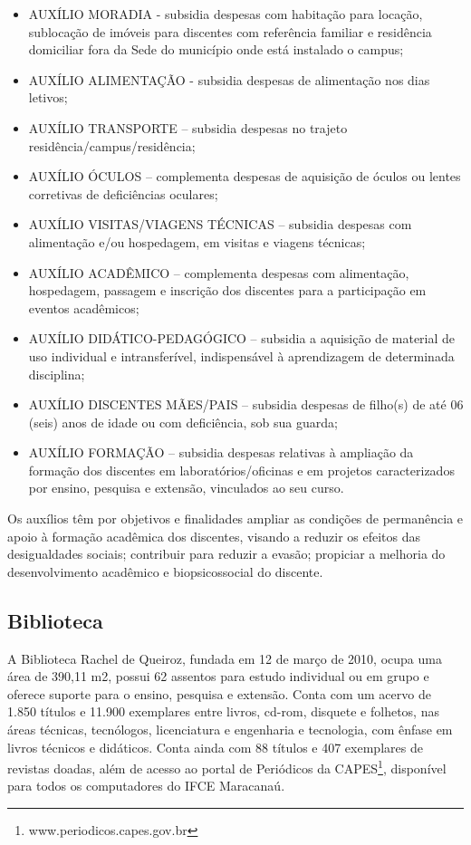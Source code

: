 \documentclass{paper}
\begin{document}
\begin{itemize}
\item AUXÍLIO MORADIA - subsidia despesas com habitação para locação, sublocação de imóveis para discentes com referência familiar e residência domiciliar fora da Sede do município onde está instalado o campus;
\item AUXÍLIO ALIMENTAÇÃO - subsidia despesas de alimentação nos dias letivos;
\item AUXÍLIO TRANSPORTE – subsidia despesas no trajeto residência/campus/residência;
\item AUXÍLIO ÓCULOS – complementa despesas de aquisição de óculos ou lentes corretivas de deficiências oculares;
\item AUXÍLIO VISITAS/VIAGENS TÉCNICAS – subsidia despesas com alimentação e/ou hospedagem, em visitas e viagens técnicas;
\item AUXÍLIO ACADÊMICO – complementa despesas com alimentação, hospedagem, passagem e inscrição dos discentes para a participação em eventos acadêmicos;
\item AUXÍLIO DIDÁTICO-PEDAGÓGICO – subsidia a aquisição de material de uso individual e intransferível, indispensável à aprendizagem de determinada disciplina;
\item AUXÍLIO DISCENTES MÃES/PAIS – subsidia despesas de filho(s) de até 06 (seis) anos de idade ou com deficiência, sob sua guarda;
\item AUXÍLIO FORMAÇÃO – subsidia despesas relativas à ampliação da formação dos discentes em laboratórios/oficinas e em projetos caracterizados por ensino, pesquisa e extensão, vinculados ao seu curso.
\end{itemize}

Os auxílios têm por objetivos e finalidades ampliar as condições de permanência e apoio à formação acadêmica dos discentes, visando a reduzir os efeitos das desigualdades sociais; contribuir para reduzir a evasão; propiciar a melhoria do desenvolvimento acadêmico e biopsicossocial do discente.

\subsection{Biblioteca}

A Biblioteca Rachel de Queiroz, fundada em 12 de março de 2010, ocupa uma área de 390,11 m2, possui 62 assentos para estudo individual ou em grupo e oferece suporte para o ensino, pesquisa e extensão. Conta com um acervo de 1.850 títulos e 11.900 exemplares entre livros, cd-rom, disquete e folhetos, nas áreas técnicas, tecnólogos, licenciatura e engenharia e tecnologia, com ênfase em livros técnicos e didáticos. Conta ainda com 88 títulos e 407 exemplares de revistas doadas, além de acesso ao portal de Periódicos da CAPES\footnote{www.periodicos.capes.gov.br}, disponível para todos os computadores do IFCE Maracanaú.
\end{document}
